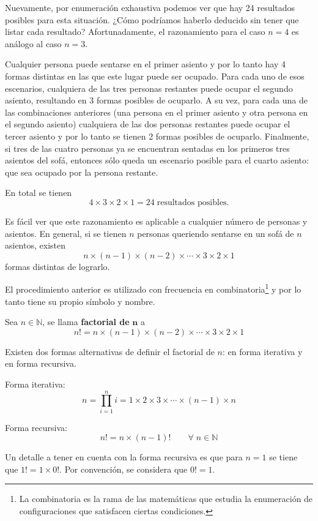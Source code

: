 \documentclass[
  letterpaper,
  DIV=11,
  numbers=noendperiod]{scrreprt}
\begin{document}
Nuevamente, por enumeración exhaustiva podemos ver que hay 24 resultados
posibles para esta situación. ¿Cómo podríamos haberlo deducido sin tener
que listar cada resultado? Afortunadamente, el razonamiento para el caso
\(n=4\) es análogo al caso \(n=3\).

Cualquier persona puede sentarse en el primer asiento y por lo tanto hay
4 formas distintas en las que este lugar puede ser ocupado. Para cada
uno de esos escenarios, cualquiera de las tres personas restantes puede
ocupar el segundo asiento, resultando en 3 formas posibles de ocuparlo.
A su vez, para cada una de las combinaciones anteriores (una persona en
el primer asiento y otra persona en el segundo asiento) cualquiera de
las dos personas restantes puede ocupar el tercer asiento y por lo tanto
se tienen 2 formas posibles de ocuparlo. Finalmente, si tres de las
cuatro personas ya se encuentran sentadas en los primeros tres asientos
del sofá, entonces sólo queda un escenario posible para el cuarto
asiento: que sea ocupado por la persona restante.

En total se tienen
\[4 \times 3 \times 2 \times 1 = 24 \;\text{resultados posibles.}\]

Es fácil ver que este razonamiento es aplicable a cualquier número de
personas y asientos. En general, si se tienen \(n\) personas queriendo
sentarse en un sofá de \(n\) asientos, existen
\[n \times (n-1) \times (n-2) \times \cdots \times 3 \times 2 \times 1\]
formas distintas de lograrlo.

El procedimiento anterior es utilizado con frecuencia en
combinatoria\footnote{La combinatoria es la rama de las matemáticas que
  estudia la enumeración de configuraciones que satisfacen ciertas
  condiciones.} y por lo tanto tiene su propio símbolo y nombre.

Sea \(n \in \mathbb{N}\), se llama \textbf{factorial de} \(\mathbf{n}\)
a
\[n! = n \times (n-1)  \times (n-2) \times \cdots \times 3 \times 2 \times 1\]

Existen dos formas alternativas de definir el factorial de \(n\): en
forma iterativa y en forma recursiva.

Forma iterativa:
\[n = \prod_{i=1}^n i = 1 \times 2 \times 3 \times \cdots \times (n-1) \times n\]

Forma recursiva:
\[n! = n \times (n-1)! \qquad \forall \; n \in \mathbb{N}\]

Un detalle a tener en cuenta con la forma recursiva es que para \(n=1\)
se tiene que \(1! = 1 \times 0!\). Por convención, se considera que
\(0! = 1\).
\end{document}
